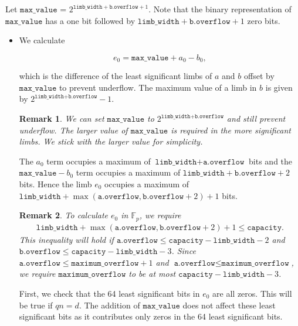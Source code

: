 \documentclass[a4paper, 12pt]{article}
\newtheorem*{remark}{Remark}
\begin{document}
Let $\texttt{max\_value}$ = $2^{\texttt{limb\_width}+\texttt{b.overflow}+1}$. Note that the binary representation of $\texttt{max\_value}$ has a one bit followed by $\texttt{limb\_width} + \texttt{b.overflow}+1$ zero bits. 

\begin{itemize}
  \item We calculate 

    $$e_0 = \texttt{max\_value} + a_0 - b_0,$$

    which is the difference of the least significant limbs of $a$ and $b$ offset by $\texttt{max\_value}$ to prevent underflow.  The maximum value of a limb in $b$ is given by $2^{\texttt{limb\_width} + \texttt{b.overflow}}-1$.

    \begin{remark}
    We can set $\texttt{max\_value}$ to $2^{\texttt{limb\_width}+\texttt{b.overflow}}$ and still prevent underflow. The larger value of $\texttt{max\_value}$ is required in the more significant limbs. We stick with the larger value for simplicity.
    \end{remark}
    
    The $a_0$ term occupies a maximum of $\texttt{limb\_width} + \texttt{a.overflow}$ bits and the $\texttt{max\_value} - b_0$ term occupies a maximum of $\texttt{limb\_width} + \texttt{b.overflow} + 2$ bits. Hence the limb $e_0$ occupies a maximum of $\texttt{limb\_width} + \max(\texttt{a.overflow}, \texttt{b.overflow} + 2) + 1$ bits.

    \begin{remark}
    To calculate $e_0$ in $\mathbb{F}_p$, we require 
\begin{align*}
  \texttt{limb\_width} + \max(\texttt{a.overflow}, \texttt{b.overflow} + 2) + 1 \le \texttt{capacity}.
\end{align*}
This inequality will hold if $\texttt{a.overflow} \le \texttt{capacity} - \texttt{limb\_width} - 2$ and $\texttt{b.overflow} \le \texttt{capacity} - \texttt{limb\_width} - 3$. Since $\texttt{a.overflow} \le \texttt{maximum\_overflow} + 1$ and $\texttt{a.overflow} \le \texttt{maximum\_overflow}$, we require $\texttt{maximum\_overflow}$ to be at most $\texttt{capacity} - \texttt{limb\_width} - 3$.
    \end{remark}
    
    First, we check that the 64 least significant bits in $e_0$ are all zeros. This will be true if $qn = d$. The addition of $\texttt{max\_value}$ does not affect these least significant bits as it contributes only zeros in the 64 least significant bits.


\end{itemize}
\end{document}
